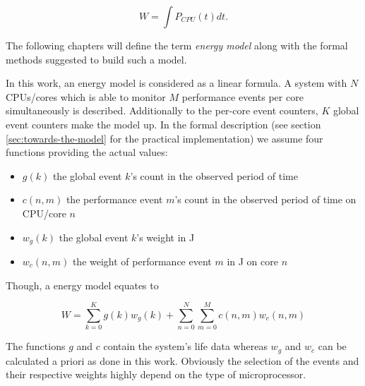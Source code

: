 \begin{equation}
  W = \int P_{CPU}(t)dt.
\end{equation}


\label{sec:model}

The following chapters will define the term \emph{energy model} along with  the
formal methods suggested to build such a model.


\label{sec:model-properties}

In this work, an energy model is considered as a linear formula. A system with
$N$ CPUs/cores which is able to monitor $M$ performance events per core
simultaneously is described. Additionally to the per-core event counters,
$K$ global event counters make the model up. In the formal description (see
section \ref{sec:towards-the-model} for the practical implementation) we assume
four functions providing the actual values:

\begin{itemize}

\item $g(k)$ the global event $k$'s count in the observed period of time

\item $c(n, m)$ the performance event $m$'s count in the observed period of time
      on CPU/core $n$

\item $w_g(k)$ the global event $k$'s weight in \si{\joule}

\item $w_c(n, m)$ the weight of performance event $m$ in \si{\joule} on core
$n$

\end{itemize}

Though, a energy model equates to

\begin{equation}
W = \sum\limits_{k=0}^K g(k) w_g(k) +
\sum\limits_{n=0}^N \sum\limits_{m=0}^M c(n, m) w_c(n,m)
\end{equation}

The functions $g$ and $c$ contain the system's life data whereas $w_g$ and
$w_c$ can be calculated a priori as done in this work. Obviously the selection
of the events and their respective weights highly depend on the type of
microprocessor.


\label{sec:min-events}

